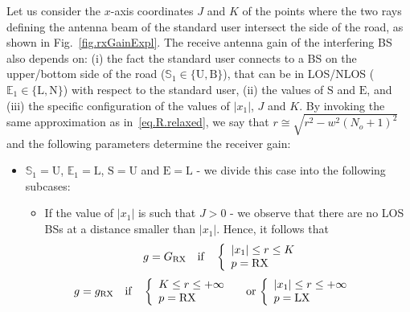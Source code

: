 \documentclass[10pt,journal,a4paper]{IEEEtran}
\begin{document}
Let us consider the $x$-axis coordinates $J$ and $K$ of the points where the two rays defining the antenna beam of the standard user intersect the side of the road, as shown in Fig.~\ref{fig.rxGainExpl}. The receive antenna gain of the interfering BS also depends on: (i) the fact the standard user connects to a BS on the upper/bottom side of the road ($\mathbb{S}_1 \in \{\mathrm{U},\mathrm{B}\}$), that can be in LOS/NLOS ($\mathbb{E}_1 \in \{\mathrm{L},\mathrm{N}\}$) with respect to the standard user, (ii) the values of $\mathrm{S}$ and $\mathrm{E}$, and (iii) the specific configuration of the values of $|x_1|$, $J$ and $K$. By invoking the same approximation as in~\eqref{eq.R.relaxed}, we say that $r \cong \sqrt{r^2 - w^2(N_o+1)^2}$ and the following parameters determine the receiver gain:
\begin{itemize}
\item $\mathbb{S}_1 = \mathrm{U}$, $\mathbb{E}_1 = \mathrm{L}$, $\mathrm{S} = \mathrm{U}$ and $\mathrm{E} = \mathrm{L}$ - we divide this case into the following subcases:
	\begin{itemize}
	\item If the value of $|x_1|$ is such that $J > 0$ - we observe that there are no LOS BSs at a distance smaller than $|x_1|$. Hence, it follows that
	\begin{equation}\label{eq.p1.2}
		g = G_\mathrm{RX} \quad \text{if} \quad \left\{ 
			\begin{array}{l l}
				|x_1| \leq r \leq K & \\
				p = \mathrm{RX} & 
				\end{array} \right.
	\end{equation}
	\begin{equation}
		\hspace{-10mm}g = g_\mathrm{RX} \quad \text{if} \quad \left\{ 
			\begin{array}{l l}
				K \leq r \leq +\infty & \\
				p = \mathrm{RX} & 
				\end{array} \right. \,\text{or}\, \left\{ 
			\begin{array}{l l}
				|x_1| \leq r \leq +\infty & \\
				p = \mathrm{LX} & 
				\end{array} \right.\hspace{-5mm}
	\end{equation}


\end{itemize}
\end{itemize}
\end{document}
